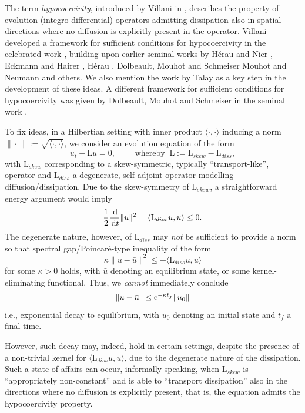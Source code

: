 \documentclass{amsart}
\newcommand{\norm}[2]{\|{#1}\|_{{#2}}}
\newcommand{\ud}{\,{\rm d}}
\theoremstyle{definition}
\theoremstyle{remark}
\numberwithin{equation}{section}
\begin{document}
The term \emph{hypocoercivity}, introduced by Villani in \cite{villani},   {describes} the property of evolution (integro-differential) operators admitting dissipation also in spatial directions where no diffusion is explicitly present in the operator. Villani developed a framework for sufficient conditions for hypocoercivity in the celebrated work \cite{villani}, building upon earlier seminal works by H\'erau and Nier \cite{herau_nier}, Eckmann and Hairer \cite{jeckmann_hairer},  {H\'erau  \cite{herau2006}},  {Dolbeault, Mouhot and Schmeiser \cite{Dolbeault09}} Mouhot and Neumann \cite{mouhot_neumann} and others.  {We also mention the work by Talay \cite{Talay2002} as a key step in the development of these ideas.}
 A different framework for sufficient conditions for hypocoercivity was given by Dolbeault, Mouhot and Schmeiser in the seminal work \cite{DMS_TAMS}.

To fix ideas, in a Hilbertian setting with inner product $\langle \cdot, \cdot\rangle $ inducing a norm $\norm{\cdot}{}:=\sqrt{\langle \cdot, \cdot\rangle }$, we consider an evolution equation of the form
 \begin{equation}\label{PDE_intro}
 	u_t + \mathrm{L} u =0, \qquad\text{ whereby }\ \mathrm{L}:=\mathrm{L}_{skew} - \mathrm{L}_{diss},
 \end{equation}
 with $\mathrm{L}_{skew} $ corresponding to a skew-symmetric, typically ``transport-like'', operator and $\mathrm{L}_{diss}$  a degenerate, self-adjoint operator modelling diffusion/dissipation.  Due to the skew-symmetry of $\mathrm{L}_{ {skew}}$, a straightforward energy argument would imply
 \[
 \frac{1}{2}\frac{\ud}{\ud t}	\|u \|^2 =\langle  \mathrm{L}_{diss}u,u\rangle \le 0.
 \]
 The degenerate nature, however, of $\mathrm{L}_{diss}$ may \emph{not} be sufficient to provide a norm so that spectral gap/Poincar\'e-type inequality of the form
 \[
 \kappa \|u-\bar{u}\|^2\le -\langle  \mathrm{L}_{diss}u,u\rangle
 \]
 for some $\kappa>0$ holds, with $\bar{u}$ denoting an equilibrium state, or some kernel-eliminating functional. Thus, we \emph{cannot} immediately conclude
 \[
 \|u-\bar{u}\|\le{\rm e}^{-\kappa t_f^{}}\|u_0\|
 \]
 i.e., exponential decay to equilibrium, with $u_0$ denoting an initial state and $t_f$ a final time.

 However, such decay may, indeed, hold in certain settings, despite the presence of a non-trivial kernel for $ \langle  \mathrm{L}_{diss}u,u\rangle $, due to the degenerate nature of the dissipation. Such a state of affairs can occur, informally speaking, when $\mathrm{L}_{skew}$ is ``appropriately non-constant'' and is able to ``transport dissipation'' also in the directions where no diffusion is explicitly present, that is, the equation admits the hypocoercivity property.
\end{document}
